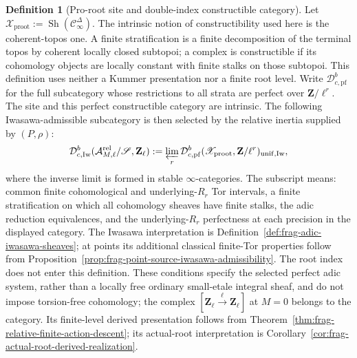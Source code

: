 \documentclass[11pt]{article}
\theoremstyle{definition}
\newtheorem{definition}[theorem]{Definition}
\theoremstyle{remark}
\begin{document}
\begin{definition}[Pro-root site and double-index constructible category]
Let
$\mathscr X_{\mathrm{proot}}:=\operatorname{Sh}(\mathcal C_\infty^\Delta)$.
The intrinsic notion of constructibility used here is the coherent-topos one.
A finite stratification is a finite decomposition of the terminal topos by
coherent locally closed subtopoi; a complex is constructible if its cohomology
objects are locally constant with finite stalks on those subtopoi.  This
definition uses neither a Kummer presentation nor a finite root level.  Write
$\mathcal D^b_{c,\mathrm{pf}}$ for the full subcategory whose restrictions to
all strata are perfect over $\mathbf Z/\ell^r$.  The site and this perfect
constructible category are intrinsic.  The following Iwasawa-admissible
subcategory is then selected by the relative inertia supplied by $(P,\rho)$:
\begin{equation}
 \mathcal D^b_{c,\mathrm{Iw}}
 (\mathcal A_{M,\ell}^{\mathrm{rel}}/\mathscr S,\mathbf Z_\ell)
 :=\varprojlim_r
   \mathcal D^b_{c,\mathrm{pf}}(\mathscr X_{\mathrm{proot}},
                   \mathbf Z/\ell^r)_{\mathrm{unif,Iw}},
 \label{eq:frag-intrinsic-root-category}
\end{equation}
where the inverse limit is formed in stable $\infty$-categories.  The
subscript means: common finite cohomological and underlying-$R_r$ Tor
intervals, a finite stratification on which all cohomology sheaves have finite
stalks, the adic reduction equivalences, and
the underlying-$R_r$ perfectness at each precision in the displayed
category.  The Iwasawa interpretation is
Definition~\ref{def:frag-adic-iwasawa-sheaves}; at points its
additional classical finite-Tor properties follow from
Proposition~\ref{prop:frag-point-source-iwasawa-admissibility}.  The root
index does not enter this definition.  These conditions specify the selected perfect adic system, rather
than a locally free ordinary small-etale integral sheaf, and do not
impose torsion-free cohomology;
the complex $[\mathbf Z_\ell\xrightarrow{\ell}\mathbf Z_\ell]$ at $M=0$
belongs to the category.  Its finite-level derived presentation follows from
Theorem~\ref{thm:frag-relative-finite-action-descent}; its actual-root
interpretation is Corollary~\ref{cor:frag-actual-root-derived-realization}.
\end{definition}
\end{document}
